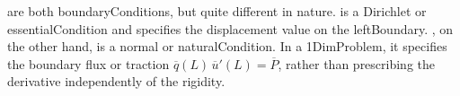 %
\begin{remark}
	 are both \glspl{boundaryCondition}, but quite
	different in nature.  is a Dirichlet or \gls{essentialCondition} and specifies
	the displacement value on the \gls{leftBoundary}. , on the other hand, is a normal
	or \gls{naturalCondition}. In a \gls{1DimProblem}, it specifies the boundary flux or traction
	$\overline{q}(L)\,\overline{u}'(L)=\overline{P}$, rather than prescribing the derivative independently of the rigidity.
\end{remark}
%
